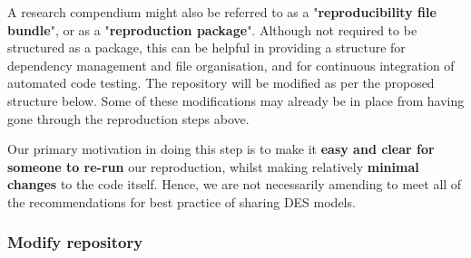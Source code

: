 A research compendium might also be referred to as a "\textbf{reproducibility file bundle}",\autocite{arguillas_10_2022} or as a "\textbf{reproduction package}".\autocite{krafczyk_learning_2021} Although not required to be structured as a package, this can be helpful in providing a structure for dependency management and file organisation, and for continuous integration of automated code testing.\autocite{marwick_packaging_2018} The repository will be modified as per the proposed structure below. Some of these modifications may already be in place from having gone through the reproduction steps above.

Our primary motivation in doing this step is to make it \textbf{easy and clear for someone to re-run} our reproduction, whilst making relatively \textbf{minimal changes} to the code itself. Hence, we are not necessarily amending to meet all of the recommendations for best practice of sharing DES models.

\vspace{0.5cm}
\subsubsection{Modify repository}

